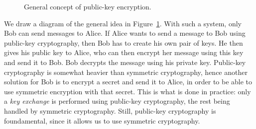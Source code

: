 \begin{figure}[h]
  \caption{General concept of public-key encryption.}
  \label{fig:crypto-asym}
\end{figure}
We draw a diagram of the general idea in Figure~\ref{fig:crypto-asym}. With such
a system, only Bob can send messages to Alice. If Alice wants to send a message
to Bob using public-key cryptography, then Bob has to create his own pair of
keys. He then gives his public key to Alice, who can then encrypt her message
using this key and send it to Bob. Bob decrypts the message using his private
key. Public-key cryptography is somewhat heavier than symmetric
cryptography, hence another solution for Bob is to encrypt a secret and send it
to Alice, in order to be able to use symmetric encryption with that secret. This
is what is done in practice: only a \emph{key exchange} is performed using
public-key cryptography, the rest being handled by symmetric cryptography.
Still, public-key cryptography is foundamental, since it allows us to use
symmetric cryptography.

